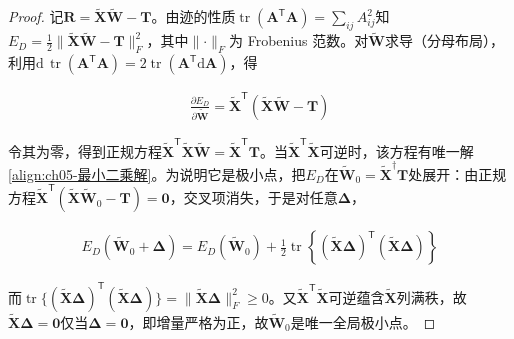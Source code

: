 \documentclass[../../main.tex]{subfiles}
\begin{document}
\begin{proof}
记$\boldsymbol{R}=\tilde{\boldsymbol{X}}\tilde{\boldsymbol{W}}-\boldsymbol{T}$。由迹的性质$\operatorname{tr}(\boldsymbol{A}^{\mathsf{T}}\boldsymbol{A})=\sum_{ij}A_{ij}^{2}$知$E_D=\frac{1}{2}\lVert\tilde{\boldsymbol{X}}\tilde{\boldsymbol{W}}-\boldsymbol{T}\rVert_F^{2}$，其中$\lVert\cdot\rVert_F$为 Frobenius 范数。对$\tilde{\boldsymbol{W}}$求导（分母布局），利用$\mathrm{d}\,\operatorname{tr}(\boldsymbol{A}^{\mathsf{T}}\boldsymbol{A})=2\operatorname{tr}(\boldsymbol{A}^{\mathsf{T}}\mathrm{d}\boldsymbol{A})$，得

\begin{align}
  \frac{\partial E_D}{\partial\tilde{\boldsymbol{W}}}=\tilde{\boldsymbol{X}}^{\mathsf{T}}(\tilde{\boldsymbol{X}}\tilde{\boldsymbol{W}}-\boldsymbol{T})
\end{align}

令其为零，得到正规方程$\tilde{\boldsymbol{X}}^{\mathsf{T}}\tilde{\boldsymbol{X}}\tilde{\boldsymbol{W}}=\tilde{\boldsymbol{X}}^{\mathsf{T}}\boldsymbol{T}$。当$\tilde{\boldsymbol{X}}^{\mathsf{T}}\tilde{\boldsymbol{X}}$可逆时，该方程有唯一解\eqref{align:ch05-最小二乘解}。为说明它是极小点，把$E_D$在$\tilde{\boldsymbol{W}}_0=\tilde{\boldsymbol{X}}^{\dagger}\boldsymbol{T}$处展开：由正规方程$\tilde{\boldsymbol{X}}^{\mathsf{T}}(\tilde{\boldsymbol{X}}\tilde{\boldsymbol{W}}_0-\boldsymbol{T})=\boldsymbol{0}$，交叉项消失，于是对任意$\boldsymbol{\Delta}$，

\begin{align}
  E_D(\tilde{\boldsymbol{W}}_0+\boldsymbol{\Delta})=E_D(\tilde{\boldsymbol{W}}_0)+\frac{1}{2}\operatorname{tr}\left\{(\tilde{\boldsymbol{X}}\boldsymbol{\Delta})^{\mathsf{T}}(\tilde{\boldsymbol{X}}\boldsymbol{\Delta})\right\}
\end{align}

而$\operatorname{tr}\{(\tilde{\boldsymbol{X}}\boldsymbol{\Delta})^{\mathsf{T}}(\tilde{\boldsymbol{X}}\boldsymbol{\Delta})\}=\lVert\tilde{\boldsymbol{X}}\boldsymbol{\Delta}\rVert_F^{2}\geqslant 0$。又$\tilde{\boldsymbol{X}}^{\mathsf{T}}\tilde{\boldsymbol{X}}$可逆蕴含$\tilde{\boldsymbol{X}}$列满秩，故$\tilde{\boldsymbol{X}}\boldsymbol{\Delta}=\boldsymbol{0}$仅当$\boldsymbol{\Delta}=\boldsymbol{0}$，即增量严格为正，故$\tilde{\boldsymbol{W}}_0$是唯一全局极小点。
\end{proof}
\end{document}
